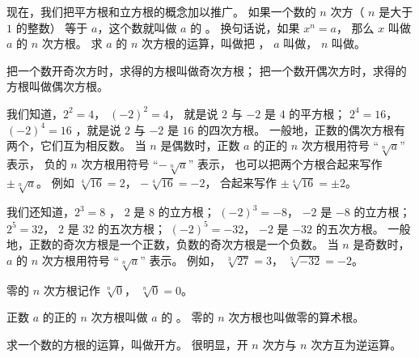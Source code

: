 \begin{enhancedline}
\begin{xiaotis}

\end{xiaotis}
\lianxijiange


现在，我们把平方根和立方根的概念加以推广。
如果一个数的 $n$ 次方（ $n$ 是大于 $1$ 的整数） 等于 $a$，这个数就叫做 $a$ 的 。
换句话说，如果 $x^n = a$， 那么 $x$ 叫做 $a$ 的 $n$ 次方根。
求 $a$ 的 $n$ 次方根的运算，叫做把 ，
$a$ 叫做，
$n$ 叫做。

把一个数开奇次方时，求得的方根叫做奇次方根；
把一个数开偶次方时，求得的方根叫做偶次方根。


我们知道，$2^2 = 4$， $(-2)^2 = 4$， 就是说 $2$ 与 $-2$ 是 $4$ 的平方根；
$2^4 = 16$， $(-2)^4 = 16$ ，就是说 $2$ 与 $-2$ 是 $16$ 的四次方根。
一般地，正数的偶次方根有两个，它们互为相反数。
当 $n$ 是偶数时，正数 $a$ 的正的 $n$ 次方根用符号 “$\sqrt[n]{a}$” 表示，
负的 $n$ 次方根用符号 “$-\sqrt[n]{a}$” 表示，
也可以把两个方根合起来写作 $\pm \sqrt[n]{a}$。
例如 $\sqrt[4]{16} = 2$， $-\sqrt[4]{16} = -2$，
合起来写作 $\pm \sqrt[4]{16} = \pm 2$。

我们还知道，$2^3 = 8$ ， $2$ 是 $8$ 的立方根；
$(-2)^3 = -8$， $-2$ 是 $-8$ 的立方根；
$2^5 = 32$， $2$ 是 $32$ 的五次方根；
$(-2)^5 = -32$， $-2$ 是 $-32$ 的五次方根。
一般地，正数的奇次方根是一个正数，负数的奇次方根是一个负数。
当 $n$ 是奇数时， $a$ 的 $n$ 次方根用符号 “$\sqrt[n]{a}$” 表示。
例如， $\sqrt[3]{27} = 3$， $\sqrt[5]{-32} = -2$。

零的 $n$ 次方根记作 $\sqrt[n]{0}$， $\sqrt[n]{0} = 0$。

正数 $a$ 的正的 $n$ 次方根叫做 $a$ 的 。
零的 $n$ 次方根也叫做零的算术根。

求一个数的方根的运算，叫做开方。
很明显，开 $n$ 次方与 $n$ 次方互为逆运算。

\end{enhancedline}

